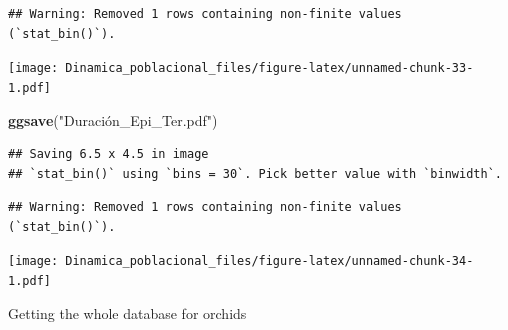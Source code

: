 \documentclass[
]{book}
\newenvironment{Shaded}{\begin{snugshade}}{\end{snugshade}}
\newcommand{\AttributeTok}[1]{\textcolor[rgb]{0.13,0.29,0.53}{#1}}
\newcommand{\FunctionTok}[1]{\textcolor[rgb]{0.13,0.29,0.53}{\textbf{#1}}}
\newcommand{\NormalTok}[1]{#1}
\newcommand{\OtherTok}[1]{\textcolor[rgb]{0.56,0.35,0.01}{#1}}
\newcommand{\SpecialCharTok}[1]{\textcolor[rgb]{0.81,0.36,0.00}{\textbf{#1}}}
\newcommand{\StringTok}[1]{\textcolor[rgb]{0.31,0.60,0.02}{#1}}
\theoremstyle{definition}
\theoremstyle{definition}
\theoremstyle{definition}
\theoremstyle{definition}
\theoremstyle{remark}
\begin{document}
\begin{verbatim}
## Warning: Removed 1 rows containing non-finite values (`stat_bin()`).
\end{verbatim}

\texttt{[image: Dinamica\_poblacional\_files/figure-latex/unnamed-chunk-33-1.pdf]}

\begin{Shaded}
\begin{Highlighting}[]
\FunctionTok{ggsave}\NormalTok{(}\StringTok{"Duración\_Epi\_Ter.pdf"}\NormalTok{)}
\end{Highlighting}
\end{Shaded}

\begin{verbatim}
## Saving 6.5 x 4.5 in image
## `stat_bin()` using `bins = 30`. Pick better value with `binwidth`.
\end{verbatim}

\begin{verbatim}
## Warning: Removed 1 rows containing non-finite values (`stat_bin()`).
\end{verbatim}

\begin{Shaded}
\end{Shaded}

\texttt{[image: Dinamica\_poblacional\_files/figure-latex/unnamed-chunk-34-1.pdf]}

Getting the whole database for orchids

\begin{Shaded}
\end{Shaded}
\end{document}
